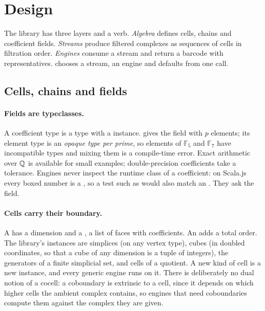 \section{Design}\label{sec:design}

The library has three layers and a verb. \emph{Algebra} defines cells, chains and coefficient fields. \emph{Streams} produce
filtered complexes as sequences of cells in filtration order. \emph{Engines} consume a stream and return a barcode with
representatives.  chooses a stream, an engine and defaults from one call.

\subsection{Cells, chains and fields}\label{sec:algebra}

\paragraph{Fields are typeclasses.}
A coefficient type is a type with a  instance.  gives the field with $p$ elements; its
element type  is an \emph{opaque type per prime}, so elements of $\mathbb{F}_5$ and $\mathbb{F}_7$ have
incompatible types and mixing them is a compile-time error. Exact arithmetic over $\mathbb{Q}$ is available for small examples;
double-precision coefficients take a tolerance. Engines never inspect the runtime class of a coefficient: on Scala.js every
boxed number is a , so a test such as  would also match an . They ask the field.

\paragraph{Cells carry their boundary.}
A  has a dimension and a , a list of faces with coefficients. An  adds a total
order. The library's instances are simplices (on any vertex type), cubes (in doubled coordinates, so that a cube of any
dimension is a tuple of integers), the generators of a finite simplicial set, and cells of a quotient. A new kind of cell is a
new instance, and every generic engine runs on it. There is deliberately no dual notion of a cocell: a coboundary is
extrinsic to a cell, since it depends on which higher cells the ambient complex contains, so engines that need
coboundaries compute them against the complex they are given.

